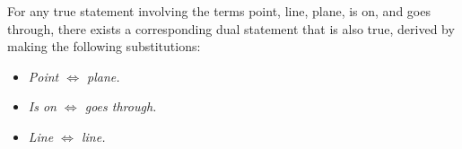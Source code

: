\begin{theorem}
    For any true statement involving the terms point, line, plane, is on, and goes through, there exists a corresponding dual statement that is also true, derived by making the following substitutions:
\end{theorem}
\begin{itemize}
    \item \textit{Point $\Leftrightarrow$ plane.}
    \item \textit{Is on $\Leftrightarrow$ goes through.}
    \item \textit{Line $\Leftrightarrow$ line.}
\end{itemize}